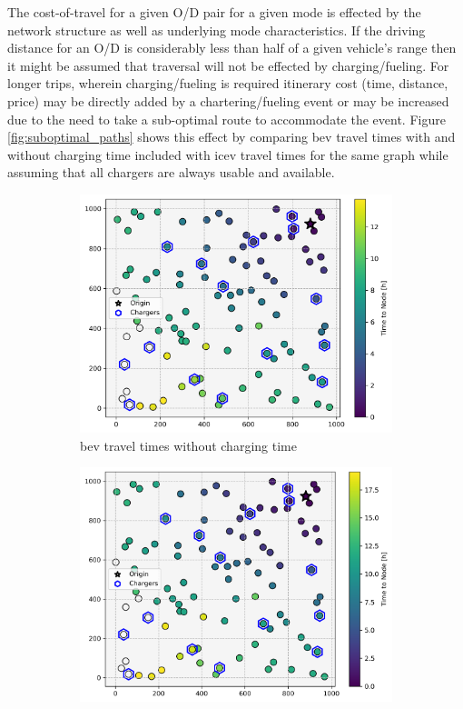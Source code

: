 \documentclass[12pt]{article}
\begin{document}
The cost-of-travel for a given O/D pair for a given mode is effected by the network structure as well as underlying mode characteristics. If the driving distance for an O/D is considerably less than half of a given vehicle's range then it might be assumed that traversal will not be effected by charging/fueling. For longer trips, wherein charging/fueling is required itinerary cost (time, distance, price) may be directly added by a chartering/fueling event or may be increased due to the need to take a sub-optimal route to accommodate the event. Figure \ref{fig:suboptimal_paths} shows this effect by comparing \gls{bev} travel times with and without charging time included with \gls{icev} travel times for the same graph while assuming that all chargers are always usable and available.

\begin{figure}[H]
	\centering
	\begin{subfigure}[t]{.5\linewidth}
		\centering\includegraphics[width = \linewidth]{figs/effect_of_charging_bev_nc.png}
		\captionsetup{width=.8\linewidth}
		\caption{\gls{bev} travel times without charging time}
	\end{subfigure}%
	\begin{subfigure}[t]{.5\linewidth}
		\centering\includegraphics[width = \linewidth]{figs/effect_of_charging_bev_c.png}

\end{subfigure}
\end{figure}
\end{document}
